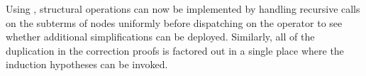 
Using , structural operations can now be implemented by handling recursive calls on the subterms of  nodes uniformly before dispatching on the operator to see whether additional simplifications can be deployed.
%
Similarly, all of the duplication in the correction proofs is factored out in a single place where the induction hypotheses can be invoked.

